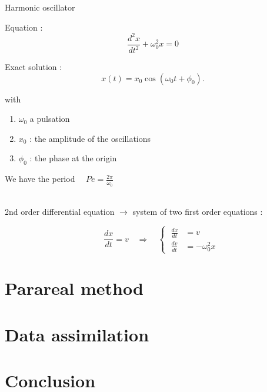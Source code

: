 \documentclass[10pt,xcolor={table,dvipsnames},t]{beamer}
\begin{document}
	\begin{frame}{Harmonic oscillator}
		\begin{minipage}{0.48\linewidth}
			Equation :
			$$\frac{d^2 x}{d t^2}+\omega_0^2 x = 0$$
		\end{minipage}
		\begin{minipage}{0.48\linewidth}
			Exact solution :
			$$x(t) = x_0 \cos(\omega_{0}t+\phi_0).$$ 
		\end{minipage}	
		with
		\begin{enumerate}[\textbullet]
			\item $\omega_0$ a pulsation
			\item $x_0$ : the amplitude of the oscillations
			\item $\phi_0$ : the phase at the origin
		\end{enumerate}
		We have the period $\quad Pe=\frac{2\pi}{\omega_0}$
		
		\; \\
		
		2nd order differential equation $\rightarrow$ system of two first order equations :
		
		$$\qquad \frac{d x}{d t}=v \quad \Rightarrow \quad \left\{\;\begin{aligned}
			\frac{d x}{d t}&=v \\
			\frac{d v}{d t}&=-\omega_0^2 x
		\end{aligned}\right.
		$$  
		
	\end{frame}

	\section{Parareal method}

	
	
	\section{Data assimilation}
	
	
	
	\section{Conclusion}
	
\end{document}
